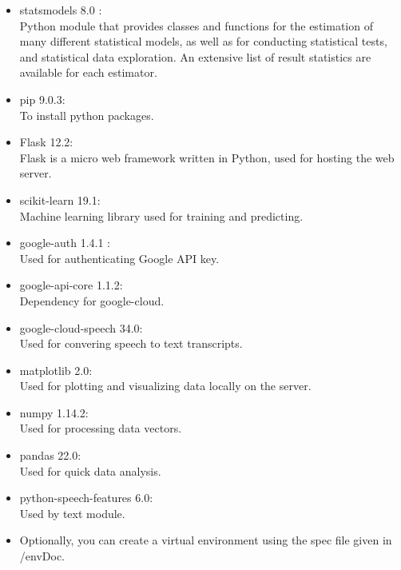 \documentclass[oneside,a4paper,12pt]{report}
\begin{document}
\begin{normalsize}
\begin{itemize}
\begin{itemize}
    
    \item statsmodels 8.0  :\\
    Python module that provides classes and functions for the estimation of many different statistical models, as well as for conducting statistical tests, and statistical data exploration. An extensive list of result statistics are available for each estimator. 
    \newline
    \item pip 9.0.3:\\
    To install python packages.
    \newline
    \item Flask 12.2:\\
    Flask is a micro web framework written in Python, used for hosting the web server.
    \newline
    \item scikit-learn 19.1:\\
    Machine learning library used for training and predicting. 
    \newline
    \item google-auth 1.4.1 : \\
    Used for authenticating Google API key.
    \newline
    \item google-api-core 1.1.2:\\
    Dependency for google-cloud.
    \newline
    \item google-cloud-speech 34.0:\\
    Used for convering speech to text transcripts.
    \newline
	\item matplotlib 2.0:\\
    Used for plotting and visualizing data locally on the server.
    \newline
    \item numpy 1.14.2:\\
    Used for processing data vectors.
    \newline
    \item pandas 22.0:\\
    Used for quick data analysis.
    \newline
    \item python-speech-features 6.0:\\
    Used by text module.
    \newline
    \item Optionally, you can create a virtual environment using the spec file given in /envDoc.\\
    

\end{itemize}
\end{itemize}
\end{normalsize}
\end{document}
